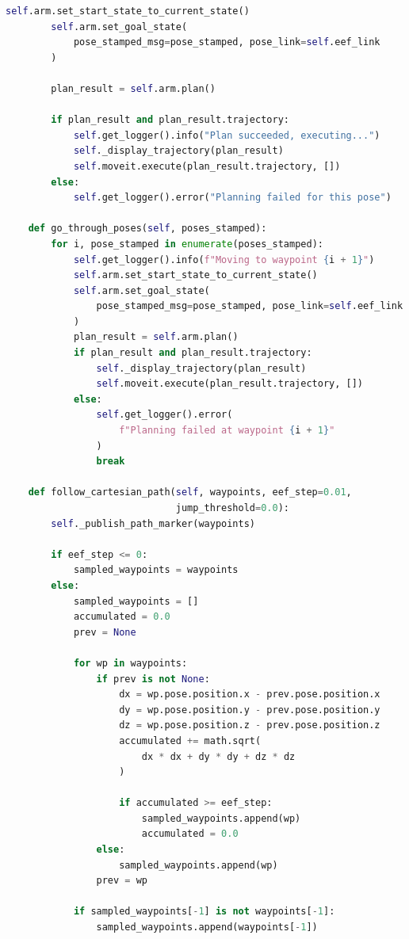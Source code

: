\documentclass[a4paper,12pt]{ctexart}
\begin{document}
\begin{lstlisting}[language=Python, caption={panda\_controller.py完整源代码}]
        self.arm.set_start_state_to_current_state()
        self.arm.set_goal_state(
            pose_stamped_msg=pose_stamped, pose_link=self.eef_link
        )

        plan_result = self.arm.plan()

        if plan_result and plan_result.trajectory:
            self.get_logger().info("Plan succeeded, executing...")
            self._display_trajectory(plan_result)
            self.moveit.execute(plan_result.trajectory, [])
        else:
            self.get_logger().error("Planning failed for this pose")

    def go_through_poses(self, poses_stamped):
        for i, pose_stamped in enumerate(poses_stamped):
            self.get_logger().info(f"Moving to waypoint {i + 1}")
            self.arm.set_start_state_to_current_state()
            self.arm.set_goal_state(
                pose_stamped_msg=pose_stamped, pose_link=self.eef_link
            )
            plan_result = self.arm.plan()
            if plan_result and plan_result.trajectory:
                self._display_trajectory(plan_result)
                self.moveit.execute(plan_result.trajectory, [])
            else:
                self.get_logger().error(
                    f"Planning failed at waypoint {i + 1}"
                )
                break

    def follow_cartesian_path(self, waypoints, eef_step=0.01,
                              jump_threshold=0.0):
        self._publish_path_marker(waypoints)

        if eef_step <= 0:
            sampled_waypoints = waypoints
        else:
            sampled_waypoints = []
            accumulated = 0.0
            prev = None

            for wp in waypoints:
                if prev is not None:
                    dx = wp.pose.position.x - prev.pose.position.x
                    dy = wp.pose.position.y - prev.pose.position.y
                    dz = wp.pose.position.z - prev.pose.position.z
                    accumulated += math.sqrt(
                        dx * dx + dy * dy + dz * dz
                    )

                    if accumulated >= eef_step:
                        sampled_waypoints.append(wp)
                        accumulated = 0.0
                else:
                    sampled_waypoints.append(wp)
                prev = wp

            if sampled_waypoints[-1] is not waypoints[-1]:
                sampled_waypoints.append(waypoints[-1])


\end{lstlisting}
\end{document}
